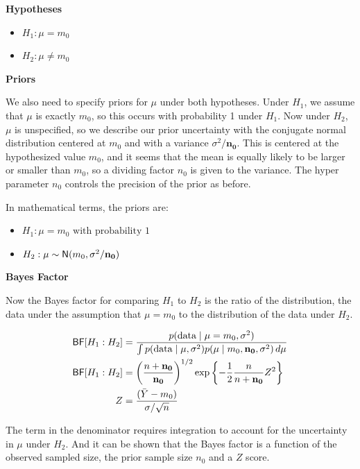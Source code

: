 \documentclass[]{book}
\providecommand{\tightlist}{%
  \setlength{\itemsep}{0pt}\setlength{\parskip}{0pt}}
\theoremstyle{definition}
\theoremstyle{definition}
\theoremstyle{definition}
\theoremstyle{remark}
\begin{document}
\textbf{Hypotheses}

\begin{itemize}
\tightlist
\item
  \(H_1: \mu = m_0\)
\item
  \(H_2: \mu \neq m_0\)
\end{itemize}

\textbf{Priors}

We also need to specify priors for \(\mu\) under both hypotheses. Under
\(H_1\), we assume that \(\mu\) is exactly \(m_0\), so this occurs with
probability 1 under \(H_1\). Now under \(H_2\), \(\mu\) is unspecified,
so we describe our prior uncertainty with the conjugate normal
distribution centered at \(m_0\) and with a variance
\(\sigma^2/\mathbf{n_0}\). This is centered at the hypothesized value
\(m_0\), and it seems that the mean is equally likely to be larger or
smaller than \(m_0\), so a dividing factor \(n_0\) is given to the
variance. The hyper parameter \(n_0\) controls the precision of the
prior as before.

In mathematical terms, the priors are:

\begin{itemize}
\tightlist
\item
  \(H_1: \mu = m_0 \text{  with probability 1}\)
\item
  \(H_2: \mu \sim \textsf{N}(m_0, \sigma^2/\mathbf{n_0})\)
\end{itemize}

\textbf{Bayes Factor}

Now the Bayes factor for comparing \(H_1\) to \(H_2\) is the ratio of
the distribution, the data under the assumption that \(\mu = m_0\) to
the distribution of the data under \(H_2\).

\[\begin{aligned}
\textsf{BF}[H_1 : H_2] &= \frac{p(\text{data} \mid \mu = m_0, \sigma^2 )}
 {\int p(\text{data} \mid \mu, \sigma^2) p(\mu \mid m_0, \mathbf{n_0}, \sigma^2)\, d \mu} \\
\textsf{BF}[H_1 : H_2] &=\left(\frac{n + \mathbf{n_0}}{\mathbf{n_0}} \right)^{1/2} \exp\left\{-\frac 1 2 \frac{n }{n + \mathbf{n_0}} Z^2 \right\} \\
 Z   &=  \frac{(\bar{Y} - m_0)}{\sigma/\sqrt{n}}
\end{aligned}\]

The term in the denominator requires integration to account for the
uncertainty in \(\mu\) under \(H_2\). And it can be shown that the Bayes
factor is a function of the observed sampled size, the prior sample size
\(n_0\) and a \(Z\) score.
\end{document}
